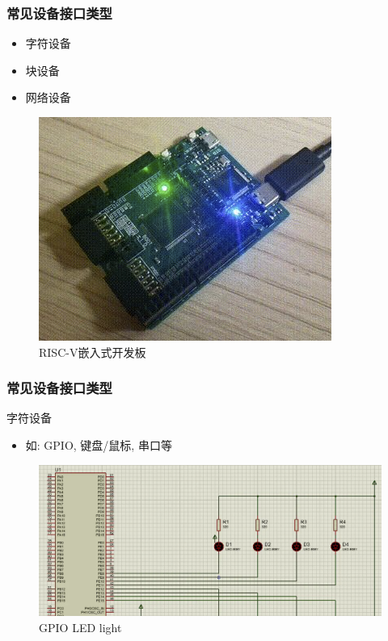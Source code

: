 \begin{frame}[fragile]
    \frametitle{常见设备接口类型}
    \begin{itemize}
    \item 字符设备
    \item 块设备
    \item 网络设备
    \end{itemize}
    \begin{figure}
    \includegraphics[width=0.4\linewidth]{figs/embed-dev.png}
    \caption{RISC-V嵌入式开发板}
\end{figure}
\end{frame}
% 
% 
% 

\begin{frame}[fragile]
    \frametitle{常见设备接口类型}
    字符设备
    \begin{itemize}
        \item 如: GPIO, 键盘/鼠标, 串口等
    \end{itemize}
    \begin{figure}
        \includegraphics[width=0.75\linewidth]{figs/char-led.png}
          \caption{GPIO LED light}
    \end{figure}
\end{frame}

